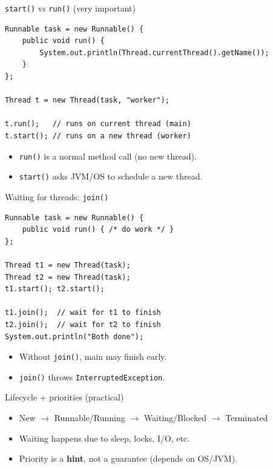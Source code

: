 \documentclass{beamer}
\begin{document}
\begin{frame}[fragile]{\texttt{start()} vs \texttt{run()} (very important)}
\begin{lstlisting}
Runnable task = new Runnable() {
    public void run() {
        System.out.println(Thread.currentThread().getName());
    }
};

Thread t = new Thread(task, "worker");

t.run();   // runs on current thread (main)
t.start(); // runs on a new thread (worker)
\end{lstlisting}
  \begin{itemize}[<+->]
    \item \texttt{run()} is a normal method call (no new thread).
    \item \texttt{start()} asks JVM/OS to schedule a new thread.
  \end{itemize}
  \slidesources{\OOPSUnitIIISources}
\end{frame}

\begin{frame}[fragile]{Waiting for threads: \texttt{join()}}
\begin{lstlisting}
Runnable task = new Runnable() {
    public void run() { /* do work */ }
};

Thread t1 = new Thread(task);
Thread t2 = new Thread(task);
t1.start(); t2.start();

t1.join();  // wait for t1 to finish
t2.join();  // wait for t2 to finish
System.out.println("Both done");
\end{lstlisting}
  \begin{itemize}[<+->]
    \item Without \texttt{join()}, main may finish early.
    \item \texttt{join()} throws \texttt{InterruptedException}.
  \end{itemize}
  \slidesources{\OOPSUnitIIISources}
\end{frame}

\begin{frame}{Lifecycle + priorities (practical)}
  \begin{itemize}[<+->]
    \item New $\rightarrow$ Runnable/Running $\rightarrow$ Waiting/Blocked $\rightarrow$ Terminated
    \item Waiting happens due to sleep, locks, I/O, etc.
    \item Priority is a \textbf{hint}, not a guarantee (depends on OS/JVM).
  \end{itemize}
  \slidesources{\OOPSUnitIIISources}
\end{frame}
\end{document}
